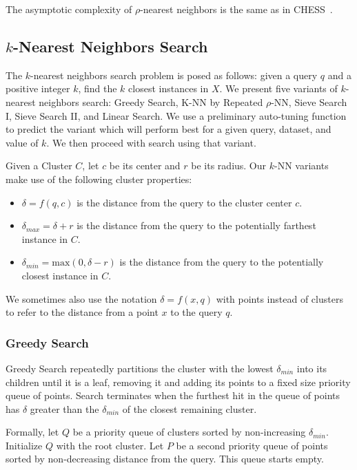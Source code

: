 The asymptotic complexity of $\rho$-nearest neighbors is the same as in CHESS~\cite{ishaq2019clustered}.

\subsection{\texorpdfstring{$k$}{k}-Nearest Neighbors Search}
\label{subsec:methods:knn-search}

The $k$-nearest neighbors search problem is posed as follows: given a query $q$ and a positive integer $k$, find the $k$ closest instances in $X$.
We present five variants of $k$-nearest neighbors search: Greedy Search, K-NN by Repeated $\rho$-NN, Sieve Search I, Sieve Search II, and 
Linear Search. We use a preliminary auto-tuning function to predict the variant which will perform 
best for a given query, dataset, and value of $k$. We then proceed with search using that variant.  

Given a Cluster $C$, let $c$ be its center and $r$ be its radius. Our $k$-NN variants make use of the following cluster 
properties:
\begin{itemize}
    \item $\delta = f(q, c)$ is the distance from the query to the cluster center $c$.
    \item $\delta_{max} = \delta + r$ is the distance from the query to the potentially farthest instance in $C$.
    \item $\delta_{min} = \text{max}(0, \delta - r)$ is the distance from the query to the potentially closest instance in $C$.
\end{itemize}

We sometimes also use the notation $\delta = f(x, q)$ with points instead of clusters to refer to the distance from a point $x$ to the query $q$.

\subsubsection{Greedy Search}
\label{subsubsec:methods:knn-search:greedy-search}
Greedy Search repeatedly partitions the cluster with the lowest $\delta_{min}$ into its children 
until it is a leaf, removing it and adding its points to a fixed size priority queue of points. Search terminates 
when the furthest hit in the queue of points has $\delta$ greater than the $\delta_{min}$ of the closest remaining
cluster.

Formally, let $Q$ be a priority queue of clusters sorted by non-increasing $\delta_{min}$. Initialize $Q$ with the root cluster.
Let $P$ be a second priority queue of points sorted by non-decreasing distance from the query. This queue starts empty.

